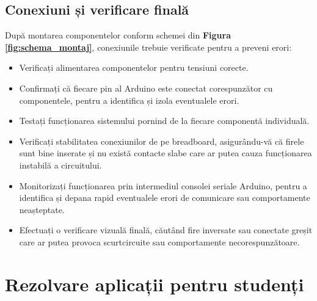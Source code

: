 \documentclass{report}
\begin{document}
\section{Conexiuni și verificare finală}
După montarea componentelor conform schemei din \textbf{Figura \ref{fig:schema_montaj}}, conexiunile trebuie verificate pentru a preveni erori:
\begin{itemize}
    \item Verificați alimentarea componentelor pentru tensiuni corecte.
    \item Confirmați că fiecare pin al Arduino este conectat corespunzător cu componentele, pentru a identifica și izola eventualele erori.
    \item Testați funcționarea sistemului pornind de la fiecare componentă individuală.
    \item Verificați stabilitatea conexiunilor de pe breadboard, asigurându-vă că firele sunt bine inserate și nu există contacte slabe care ar putea cauza funcționarea instabilă a circuitului.
    \item Monitorizați funcționarea prin intermediul consolei seriale Arduino, pentru a identifica și depana rapid eventualele erori de comunicare sau comportamente neașteptate.
    \item Efectuați o verificare vizuală finală, căutând fire inversate sau conectate greșit care ar putea provoca scurtcircuite sau comportamente necorespunzătoare.
\end{itemize}
\chapter{Rezolvare aplicații pentru studenți}
\end{document}
